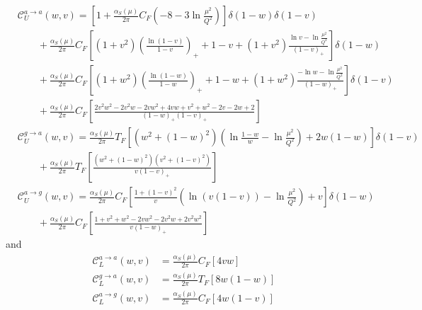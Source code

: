 \begin{equation}
    \begin{aligned}
          &\mathcal{C}^{a\to a}_U (w,v)= \left[1+\frac{\alpha_S(\mu)}{2\pi}C_F\left(-8-3\ln\frac{\mu^2}{Q^2}\right)\right]\delta(1-w)\delta(1-v)\\
        &\qquad+\frac{\alpha_S(\mu)}{2\pi}C_F\left[(1+v^2)\left(\frac{\ln(1-v)}{1-v}\right)_+ +1-v+(1+v^2)\frac{\ln v - \ln\frac{\mu^2}{Q^2}}{(1-v)_+}\right]\delta(1-w)\\
        &\qquad+\frac{\alpha_S(\mu)}{2\pi}C_F\left[(1+w^2)\left(\frac{\ln(1-w)}{1-w}\right)_+ +1-w+(1+w^2)\frac{-\ln w - \ln\frac{\mu^2}{Q^2}}{(1-w)_+}\right]\delta(1-v)\\
        &\qquad+\frac{\alpha_S(\mu)}{2\pi}C_F\left[\frac{2v^2w^2-2v^2w-2vw^2+4vw+v^2+w^2-2v-2w+2}{(1-w)_+(1-v)_+}\right]\\
        &\mathcal{C}^{g\to a}_U (w,v)=\frac{\alpha_S(\mu)}{2\pi}T_F\left[(w^2+(1-w)^2)\left(\ln \frac{1-w}{w}-\ln\frac{\mu^2}{Q^2}\right)+2w(1-w)\right]\delta(1-v)\\
        &\qquad+\frac{\alpha_S(\mu)}{2\pi}T_F\left[\frac{(w^2+(1-w)^2)(v^2+(1-v)^2)}{v(1-v)_+}\right]\\
         &\mathcal{C}^{a\to g}_U (w,v)=\frac{\alpha_S(\mu)}{2\pi} C_F\left[\frac{1+(1-v)^2}{v}\left(\ln \left(v(1-v)\right)-\ln\frac{\mu^2}{Q^2}\right)+v\right]\delta(1-w)\\
        &\qquad +\frac{\alpha_S(\mu)}{2\pi} C_F\left[\frac{1+v^2+w^2-2vw^2-2v^2w+2v^2w^2}{v(1-w)_+}\right]
    \end{aligned}
\end{equation}
and
\begin{equation}
    \begin{aligned}
          \mathcal{C}^{a\to a}_L (w,v)&= \frac{\alpha_S(\mu)}{2\pi} C_F\left[4 vw\right]\\
        \mathcal{C}^{g\to a}_L (w,v)&=\frac{\alpha_S(\mu)}{2\pi}T_F\left[8w(1-w)\right]\\
         \mathcal{C}^{a\to g}_L (w,v)&=\frac{\alpha_S(\mu)}{2\pi}C_F\left[4w(1-v)\right]
    \end{aligned}
\end{equation}
